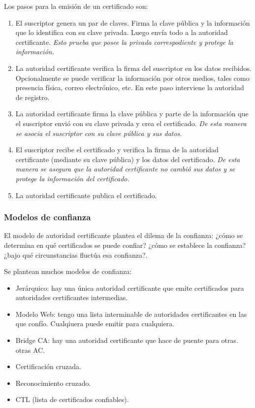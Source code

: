 Los pasos para la emisión de un certificado son:
\begin{enumerate}
	\item El suscriptor genera un par de claves. Firma la clave pública y la información que lo identifica con su clave privada. Luego envía todo a la autoridad certificante. \emph{Esto prueba que posee la privada correspodiente y protege la información.}
	\item La autoridad certificante  verifica la firma del suscriptor en los datos recibidos. Opcionalmente se puede verificar la información por otros medios, tales como presencia física, correo electrónico, etc. En este paso interviene la autoridad de registro.
	\item La autoridad certificante firma la clave pública y parte de la información que el suscriptor envió con su clave privada y crea el certificado. \emph{De esta manera se asocia el suscriptor con su clave pública y sus datos.}
	\item El suscriptor recibe el certificado y verifica la firma de la autoridad certificante (mediante su clave pública) y los datos del certificado.
	\emph{De esta manera se asegura que la autoridad certificante no cambió sus datos y se protege la información del certificado.}
	\item La autoridad certificante publica el certificado.
\end{enumerate}

\subsubsection{Modelos de confianza}
El modelo de autoridad certificante plantea el dilema de la confianza: ¿cómo se determina en qué certificados se puede confiar? ¿cómo se establece la confianza? ¿bajo qué circunstancias fluctúa esa confianza?.

Se plantean muchos modelos de confianza:
\begin{itemize}
	\item Jerárquico: hay una única autoridad certificante que emite certificados para autoridades certificantes intermedias.
	\item Modelo Web: tengo una lista interminable de autoridades certificantes en las que confío. Cualqiuera puede emitir para cualquiera.
	\item Bridge CA: hay una autoridad certificante que hace de puente para otras.
otras AC.
	\item Certificación cruzada.
	\item Reconocimiento cruzado.
	\item CTL (lista de certificados confiables).
\end{itemize}

